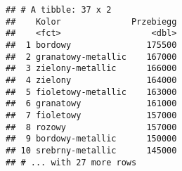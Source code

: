 \documentclass[]{article}
\newenvironment{Shaded}{\begin{snugshade}}{\end{snugshade}}
\newcommand{\KeywordTok}[1]{\textcolor[rgb]{0.13,0.29,0.53}{\textbf{#1}}}
\newcommand{\DataTypeTok}[1]{\textcolor[rgb]{0.13,0.29,0.53}{#1}}
\newcommand{\StringTok}[1]{\textcolor[rgb]{0.31,0.60,0.02}{#1}}
\newcommand{\OtherTok}[1]{\textcolor[rgb]{0.56,0.35,0.01}{#1}}
\newcommand{\OperatorTok}[1]{\textcolor[rgb]{0.81,0.36,0.00}{\textbf{#1}}}
\newcommand{\NormalTok}[1]{#1}
\begin{document}
\begin{Shaded}
\end{Shaded}

\begin{verbatim}
## # A tibble: 37 x 2
##    Kolor              Przebiegg
##    <fct>                  <dbl>
##  1 bordowy               175500
##  2 granatowy-metallic    167000
##  3 zielony-metallic      166000
##  4 zielony               164000
##  5 fioletowy-metallic    163000
##  6 granatowy             161000
##  7 fioletowy             157000
##  8 rozowy                157000
##  9 bordowy-metallic      150000
## 10 srebrny-metallic      145000
## # ... with 27 more rows
\end{verbatim}
\end{document}
